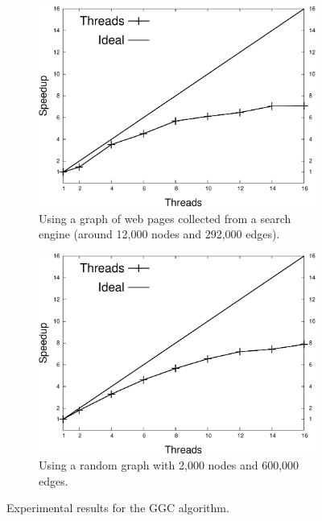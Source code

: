\newcommand{\plotsize}{0.38\textwidth}

\begin{figure}[h]
   \vspace{-0.5\intextsep}
   \centering
   \begin{subfigure}[b]{\plotsize}
      \includegraphics[width=\textwidth]{speedup_greedy-graph-coloring-search_engines.pdf}
      \caption{Using a graph of web pages collected from a search engine (around 12,000 nodes and 292,000 edges).}
   \end{subfigure}
   \begin{subfigure}[b]{\plotsize}
      \includegraphics[width=\textwidth]{speedup_greedy-graph-coloring-2000.pdf}
      \caption{Using a random graph with 2,000 nodes and 600,000 edges.\newline}
   \end{subfigure}
   \caption{Experimental results for the GGC algorithm.}
   \label{exp:graph_coloring}
   \vspace{-0.8\intextsep}
\end{figure}

